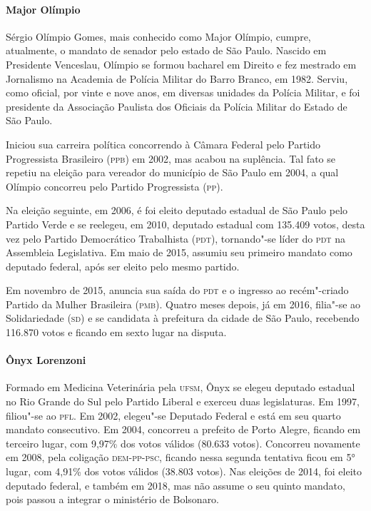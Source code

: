 \paragraph{Major Olímpio}

Sérgio Olímpio Gomes, mais conhecido como Major Olímpio, cumpre,
atualmente, o mandato de senador pelo estado de São Paulo. Nascido em
Presidente Venceslau, Olímpio se formou bacharel em Direito e fez
mestrado em Jornalismo na Academia de Polícia Militar do Barro Branco,
em 1982. Serviu, como oficial, por vinte e nove anos, em diversas
unidades da Polícia Militar, e foi presidente da Associação Paulista dos
Oficiais da Polícia Militar do Estado de São Paulo.

Iniciou sua carreira política concorrendo à Câmara Federal pelo Partido
Progressista Brasileiro (\textsc{ppb}) em 2002, mas acabou na suplência. Tal fato
se repetiu na eleição para vereador do município de São Paulo em 2004, a
qual Olímpio concorreu pelo Partido Progressista (\textsc{pp}).

Na eleição seguinte, em 2006, é foi eleito deputado estadual de São
Paulo pelo Partido Verde e se reelegeu, em 2010, deputado estadual com
135.409 votos, desta vez pelo Partido Democrático Trabalhista (\textsc{pdt}),
tornando"-se líder do \textsc{pdt} na Assembleia Legislativa. Em maio de 2015,
assumiu seu primeiro mandato como deputado federal, após ser eleito pelo
mesmo partido.

Em novembro de 2015, anuncia sua saída do \textsc{pdt} e o ingresso ao
recém"-criado Partido da Mulher Brasileira (\textsc{pmb}). Quatro meses depois, já
em 2016, filia"-se ao Solidariedade (\textsc{sd}) e se candidata à prefeitura da
cidade de São Paulo, recebendo 116.870 votos e ficando em sexto lugar na
disputa.

\enlargethispage{\baselineskip}

\paragraph{Ônyx Lorenzoni}

Formado em Medicina Veterinária pela \textsc{ufsm}, Ônyx se elegeu deputado
estadual no Rio Grande do Sul pelo Partido Liberal e exerceu duas
legislaturas. Em 1997, filiou"-se ao \textsc{pfl}. Em 2002, elegeu"-se Deputado
Federal e está em seu quarto mandato consecutivo. Em 2004, concorreu a
prefeito de Porto Alegre, ficando em terceiro lugar, com 9,97\% dos
votos válidos (80.633 votos). Concorreu novamente em 2008, pela
coligação \textsc{dem}-\textsc{pp}-\textsc{psc}, ficando nessa segunda tentativa ficou em 5° lugar,
com 4,91\% dos votos válidos (38.803 votos). Nas eleições de 2014, foi
eleito deputado federal, e também em 2018, mas não assume o seu quinto
mandato, pois passou a integrar o ministério de Bolsonaro.

